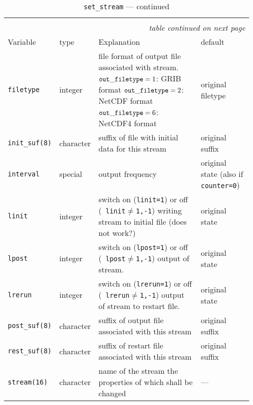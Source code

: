 \begin{longtable}{l@{\extracolsep\fill}lp{7cm}p{3.5cm}}\hline\hline
\caption[Namelist {\tt set\_stream}]{Namelist 
  {\tt set\_stream}}\\\hline\label{tabset_stream}
\endfirsthead
\caption[]{{\tt set\_stream} --- continued}\\\hline
\endhead
\hline\multicolumn{4}{r}{\slshape table continued on next page}\\
\endfoot
\hline %
\endlastfoot
Variable & type & Explanation & default \\\hline
{\tt filetype}\index{namelist variables!filetype} 
& integer & file format of output file associated
with stream.  \newline
                        ${\tt out\_filetype}=1$:  GRIB format \newline 
                        ${\tt out\_filetype}=2$:  NetCDF format
                        \newline 
                        ${\tt out\_filetype}=6$:  NetCDF4 format &
                        original filetype \\
{\tt init\_suf(8)}\index{namelist variables!init\_suf}
 & character & suffix of file with initial data for
this stream & original suffix \\
{\tt interval}\index{namelist variables!interval}
 & special & output frequency & original state (also if
{\tt counter=0})\\
{\tt linit}\index{namelist variables!linit}
 & integer & switch on ({\tt linit=1}) or off ({\tt
  linit$\neq$1,-1}) writing stream to initial file (does not work?) &
original state \\
{\tt lpost}\index{namelist variables!lpost}
 & integer & switch on ({\tt lpost=1}) or off ({\tt
  lpost$\neq$1,-1}) output of stream. & original state  \\
{\tt lrerun}\index{namelist variables!lrerun}
 & integer & switch on ({\tt lrerun=1}) or off ({\tt
  lrerun$\neq$1,-1}) output of stream to restart file. & original state \\
{\tt post\_suf(8)} & character & suffix of output file associated with
this stream & original suffix \\
{\tt rest\_suf(8)}\index{namelist variables!rest\_suf}
 & character & suffix of restart file associated
with this stream & original suffix \\
{\tt stream(16)}\index{namelist variables!stream}
 & character & name of the stream the properties of
which shall be changed & --- \\
\hline
\end{longtable}


